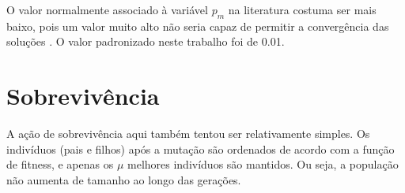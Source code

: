 O valor normalmente associado à variável $p_m$ na literatura costuma ser mais baixo, pois um valor muito alto não seria capaz de permitir a convergência das soluções \cite{eiben2011parameter}. O valor padronizado neste trabalho foi de 0.01.

\section{Sobrevivência}

A ação de sobrevivência aqui também tentou ser relativamente simples. Os indivíduos (pais e filhos) após a mutação são ordenados de acordo com a função de fitness, e apenas os $\mu$ melhores indivíduos são mantidos. Ou seja, a população não aumenta de tamanho ao longo das gerações.

